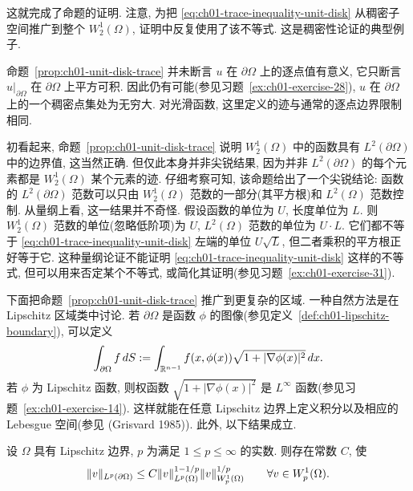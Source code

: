 这就完成了命题的证明. 注意, 为把 \eqref{eq:ch01-trace-inequality-unit-disk} 从稠密子空间推广到整个 $W_2^1(\Omega)$, 证明中反复使用了该不等式. 这是稠密性论证的典型例子.

\begin{Remark}
\label{rem:ch01-trace-not-pointwise}
命题~\ref{prop:ch01-unit-disk-trace} 并未断言 $u$ 在 $\partial\Omega$ 上的逐点值有意义, 它只断言 $u|_{\partial\Omega}$ 在 $\partial\Omega$ 上平方可积. 因此仍有可能(参见习题~\ref{ex:ch01-exercise-28}), $u$ 在 $\partial\Omega$ 上的一个稠密点集处为无穷大. 对光滑函数, 这里定义的迹与通常的逐点边界限制相同.
\end{Remark}

\begin{Remark}
\label{rem:ch01-trace-sharpness-dimensions}
初看起来, 命题~\ref{prop:ch01-unit-disk-trace} 说明 $W_2^1(\Omega)$ 中的函数具有 $L^2(\partial\Omega)$ 中的边界值, 这当然正确. 但仅此本身并非尖锐结果, 因为并非 $L^2(\partial\Omega)$ 的每个元素都是 $W_2^1(\Omega)$ 某个元素的迹. 仔细考察可知, 该命题给出了一个尖锐结论: 函数的 $L^2(\partial\Omega)$ 范数可以只由 $W_2^1(\Omega)$ 范数的一部分(其平方根)和 $L^2(\Omega)$ 范数控制. 从量纲上看, 这一结果并不奇怪. 假设函数的单位为 $U$, 长度单位为 $L$. 则 $W_2^1(\Omega)$ 范数的单位(忽略低阶项)为 $U$, $L^2(\Omega)$ 范数的单位为 $U\cdot L$. 它们都不等于 \eqref{eq:ch01-trace-inequality-unit-disk} 左端的单位 $U\sqrt L$, 但二者乘积的平方根正好等于它. 这种量纲论证不能证明 \eqref{eq:ch01-trace-inequality-unit-disk} 这样的不等式, 但可以用来否定某个不等式, 或简化其证明(参见习题~\ref{ex:ch01-exercise-31}).
\end{Remark}

下面把命题~\ref{prop:ch01-unit-disk-trace} 推广到更复杂的区域. 一种自然方法是在 Lipschitz 区域类中讨论. 若 $\partial\Omega$ 是函数 $\phi$ 的图像(参见定义~\ref{def:ch01-lipschitz-boundary}), 可以定义
\[
\MathBookFormulaID{formula-ch01-lipschitz-boundary-integral}
\int_{\partial\Omega}f\,dS
:=\int_{\mathbb R^{n-1}}f(x,\phi(x))\sqrt{1+|\nabla\phi(x)|^2}\,dx.
\]
若 $\phi$ 为 Lipschitz 函数, 则权函数 $\sqrt{1+|\nabla\phi(x)|^2}$ 是 $L^\infty$ 函数(参见习题~\ref{ex:ch01-exercise-14}). 这样就能在任意 Lipschitz 边界上定义积分以及相应的 Lebesgue 空间(参见 (Grisvard 1985)). 此外, 以下结果成立.

\setcounter{thmcount}{5}
\begin{Theorem}
\label{thm:ch01-general-trace}
设 $\Omega$ 具有 Lipschitz 边界, $p$ 为满足 $1\leq p\leq\infty$ 的实数. 则存在常数 $C$, 使
\[
\MathBookFormulaID{formula-ch01-general-trace-inequality}
\|v\|_{L^p(\partial\Omega)}
\leq C\|v\|_{L^p(\Omega)}^{1-1/p}
\|v\|_{W_p^1(\Omega)}^{1/p}
\qquad\forall v\in W_p^1(\Omega).
\]
\end{Theorem}

